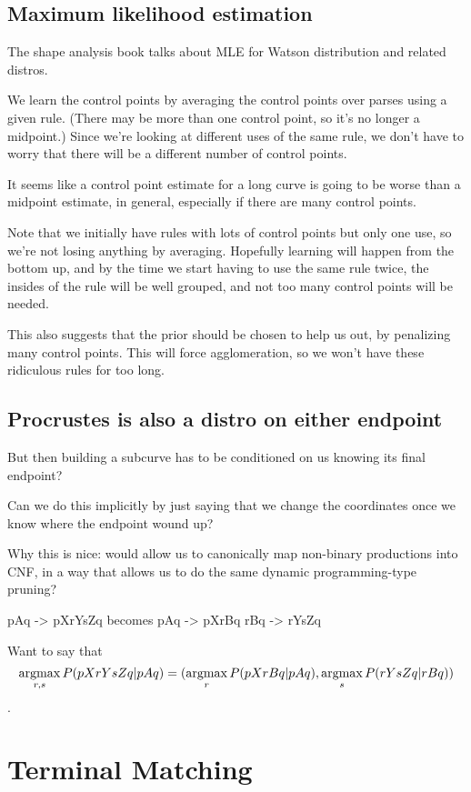 \documentclass{article}
\begin{document}
\subsection{Maximum likelihood estimation}
  The shape analysis book talks about MLE for Watson distribution and
  related distros.

  We learn the control points by averaging the control points over
  parses using a given rule. (There may be more than one control
  point, so it's no longer a midpoint.) Since we're looking at
  different uses of the same rule, we don't have to worry that there
  will be a different number of control points.

  It seems like a control point estimate for a long curve is going to
  be worse than a midpoint estimate, in general, especially if there
  are many control points.

  Note that we initially have rules with lots of control points but
  only one use, so we're not losing anything by averaging. Hopefully
  learning will happen from the bottom up, and by the time we start
  having to use the same rule twice, the insides of the rule will be
  well grouped, and not too many control points will be needed.

  This also suggests that the prior should be chosen to help us out,
  by penalizing many control points. This will force agglomeration, so
  we won't have these ridiculous rules for too long.

\subsection{Procrustes is also a distro on either endpoint}
But then building a subcurve has to be conditioned on us knowing its
final endpoint?

Can we do this implicitly by just saying that we change the
coordinates once we know where the endpoint wound up?

Why this is nice: would allow us to canonically map non-binary
productions into CNF, in a way that allows us to do the same dynamic
programming-type pruning?

pAq -> pXrYsZq
becomes
pAq -> pXrBq
rBq -> rYsZq

Want to say that $$\operatorname*{argmax}_{r,s} P(pXrYsZq|pAq) = (\operatorname*{argmax}_r
P(pXrBq|pAq), \operatorname*{argmax}_s P(rYsZq|rBq) )$$.


\section{Terminal Matching}
\end{document}
